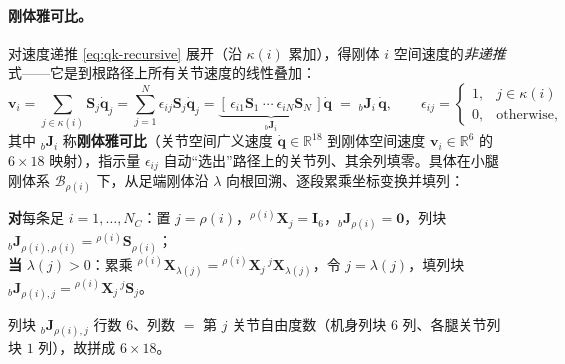 \paragraph{刚体雅可比。}
对速度递推 \cref{eq:qk-recursive} 展开（沿 $\kappa(i)$ 累加），得刚体 $i$ 空间速度的\emph{非递推}式——它是到根路径上所有关节速度的线性叠加\cite{yu2021quadruped}：
\begin{equation}
  \boldsymbol{v}_i=\sum_{j\in\kappa(i)}\mathbf{S}_j\dot{\boldsymbol{q}}_j
  =\sum_{j=1}^{N}\epsilon_{ij}\mathbf{S}_j\dot{\boldsymbol{q}}_j
  =\underbrace{[\,\epsilon_{i1}\mathbf{S}_1\ \cdots\ \epsilon_{iN}\mathbf{S}_N\,]}_{{}_{b}\mathbf{J}_i}\dot{\boldsymbol{q}}
  \;=\;{}_{b}\mathbf{J}_i\,\dot{\boldsymbol{q}},
  \qquad
  \epsilon_{ij}=\begin{cases}1,&j\in\kappa(i)\\0,&\text{otherwise},\end{cases}
  \label{eq:qk-rigid-jacobian}
\end{equation}
其中 ${}_{b}\mathbf{J}_i$ 称\textbf{刚体雅可比}（关节空间广义速度 $\dot{\boldsymbol{q}}\in\mathbb{R}^{18}$ 到刚体空间速度 $\boldsymbol{v}_i\in\mathbb{R}^6$ 的 $6\times18$ 映射），指示量 $\epsilon_{ij}$ 自动“选出”路径上的关节列、其余列填零。具体在小腿刚体系 $\mathcal{B}_{\rho(i)}$ 下，从足端刚体沿 $\lambda$ 向根回溯、逐段累乘坐标变换并填列\cite{yu2021quadruped}：
\begin{algo}\label{alg:qk-rigid-jacobian}
\textbf{对}每条足 $i=1,\dots,N_C$：置 $j=\rho(i)$，${}^{\rho(i)}\mathbf{X}_j=\mathbf{I}_6$，${}_{b}\mathbf{J}_{\rho(i)}=\mathbf{0}$，列块 ${}_{b}\mathbf{J}_{\rho(i),\rho(i)}={}^{\rho(i)}\mathbf{S}_{\rho(i)}$；\\
\textbf{当} $\lambda(j)>0$：累乘 ${}^{\rho(i)}\mathbf{X}_{\lambda(j)}={}^{\rho(i)}\mathbf{X}_j\,{}^{j}\mathbf{X}_{\lambda(j)}$，令 $j=\lambda(j)$，填列块 ${}_{b}\mathbf{J}_{\rho(i),j}={}^{\rho(i)}\mathbf{X}_j\,{}^{j}\mathbf{S}_j$。
\end{algo}
\noindent{}列块 ${}_{b}\mathbf{J}_{\rho(i),j}$ 行数 $6$、列数 $=$ 第 $j$ 关节自由度数（机身列块 $6$ 列、各腿关节列块 $1$ 列），故拼成 $6\times18$。


